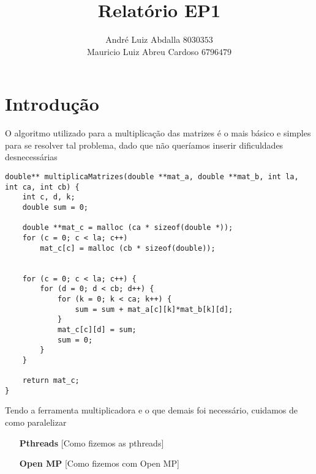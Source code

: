 \documentclass[11pt]{article}
\author{André Luiz Abdalla $8030353$ \\ Mauricio Luiz Abreu Cardoso $6796479$}
\title{Relatório EP1}
\begin{document}
    \maketitle

    \section{Introdução}

    O algoritmo utilizado para a multiplicação das matrizes é o mais básico e simples para se resolver tal problema,
    dado que não queríamos inserir dificuldades desnecessárias

    \begin{lstlisting}[caption=Função para multiplicar matrizes]
double** multiplicaMatrizes(double **mat_a, double **mat_b, int la, int ca, int cb) {
    int c, d, k;
    double sum = 0;

    double **mat_c = malloc (ca * sizeof(double *));
    for (c = 0; c < la; c++)
        mat_c[c] = malloc (cb * sizeof(double));


    for (c = 0; c < la; c++) {
        for (d = 0; d < cb; d++) {
            for (k = 0; k < ca; k++) {
                sum = sum + mat_a[c][k]*mat_b[k][d];
            }
            mat_c[c][d] = sum;
            sum = 0;
        }
    }

    return mat_c;
}
    \end{lstlisting}

    Tendo a ferramenta multiplicadora e o que demais foi necessário, cuidamos de como paralelizar \begin{itemize}
        \item[\textbf{Pthreads}] [Como fizemos as pthreads]
        \item[\textbf{Open MP}] [Como fizemos com Open MP]
    \end{itemize}
\end{document}
